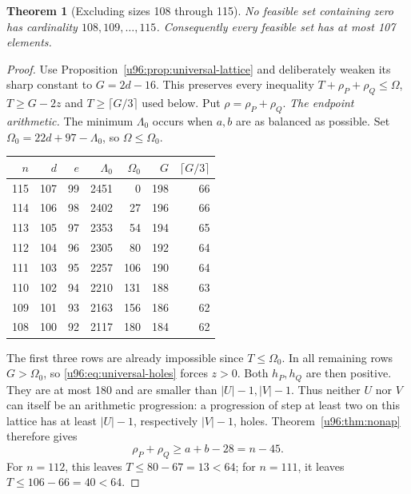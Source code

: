 \documentclass[11pt,a4paper]{article}
\newtheorem{theorem}{Theorem}[section]
\theoremstyle{remark}
\begin{document}
\begin{theorem}[Excluding sizes 108 through 115]\label{u96:thm:upper107}
No feasible set containing zero has cardinality $108,109,\ldots,115$.
Consequently every feasible set has at most 107 elements.
\end{theorem}
\begin{proof}
Use Proposition~\ref{u96:prop:universal-lattice} and deliberately weaken its
sharp constant to $G=2d-16$. This preserves every inequality
$T+\rho_P+\rho_Q\leq\Omega$, $T\geq G-2z$ and
$T\geq\lceil G/3\rceil$ used below. Put $\rho=\rho_P+\rho_Q$.
\emph{The endpoint arithmetic.}
The minimum $\Lambda_0$ occurs when $a,b$ are as balanced as possible.
Set $\Omega_0=22d+97-\Lambda_0$, so $\Omega\leq\Omega_0$.
\begin{center}
\begin{tabular}{rrrrrrr}
\toprule
$n$&$d$&$e$&$\Lambda_0$&$\Omega_0$&$G$&$\lceil G/3\rceil$\\
\midrule
115&107&99&2451&0&198&66\\
114&106&98&2402&27&196&66\\
113&105&97&2353&54&194&65\\
112&104&96&2305&80&192&64\\
111&103&95&2257&106&190&64\\
110&102&94&2210&131&188&63\\
109&101&93&2163&156&186&62\\
108&100&92&2117&180&184&62\\
\bottomrule
\end{tabular}
\end{center}
The first three rows are already impossible since $T\leq\Omega_0$.
In all remaining rows $G>\Omega_0$, so \eqref{u96:eq:universal-holes} forces $z>0$.
Both $h_P,h_Q$ are then positive. They are at most 180 and are smaller than
$|U|-1,|V|-1$. Thus neither $U$ nor $V$ can itself be an arithmetic
progression: a progression of step at least two on this lattice has at
least $|U|-1$, respectively $|V|-1$, holes.
Theorem~\ref{u96:thm:nonap} therefore gives
\begin{equation}
\rho_P+\rho_Q\geq a+b-28=n-45.\label{u96:eq:nonap-budget}
\end{equation}
For $n=112$, this leaves $T\leq80-67=13<64$;
for $n=111$, it leaves $T\leq106-66=40<64$.


\end{proof}
\end{document}
